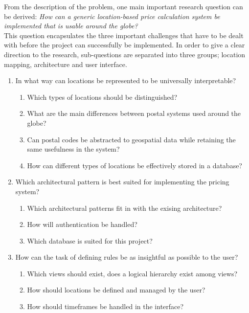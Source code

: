 From the description of the problem, one main important research question can be derived: \textit{How can a generic location-based price calculation system be implemented that is usable around the globe?} \\

This question encapsulates the three important challenges that have to be dealt with before the project can successfully be implemented. In order to give a clear direction to the research, sub-questions are separated into three groups; location mapping, architecture and user interface.

\begin{enumerate}

  \item In what way can locations be represented to be universally interpretable?
        \begin{enumerate}
          \item Which types of locations should be distinguished?
          \item What are the main differences between postal systems used around the globe?
          \item Can postal codes be abstracted to geospatial data while retaining the same usefulness in the system?
          \item How can different types of locations be effectively stored in a database?
        \end{enumerate}

  \item Which architectural pattern is best suited for implementing the pricing system?
        \begin{enumerate}
          \item Which architectural patterns fit in with the exising architecture?
          \item How will authentication be handled?
          \item Which database is suited for this project?
        \end{enumerate}

  \item How can the task of defining rules be as insightful as possible to the user?
        \begin{enumerate}
          \item Which views should exist, does a logical hierarchy exist among views?
          \item How should locations be defined and managed by the user?
          \item How should timeframes be handled in the interface?
        \end{enumerate}

\end{enumerate}

